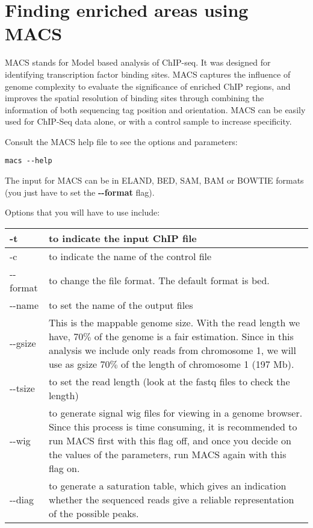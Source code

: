 \section{Finding enriched areas using MACS}

\begin{information}
MACS stands for Model based analysis of ChIP-seq. It was designed for identifying transcription factor binding sites. MACS captures the influence of genome complexity to evaluate the significance of enriched ChIP regions, and improves the spatial resolution of binding sites through combining the information of both sequencing tag position and orientation. MACS can be easily used for ChIP-Seq data alone, or with a control sample to increase specificity.
\end{information}

\begin{steps}
Consult the MACS help file to see the options and parameters:

\begin{lstlisting}
macs --help
\end{lstlisting}
\end{steps}

\begin{information}
The input for MACS can be in ELAND, BED, SAM, BAM or BOWTIE formats (you just have to set the \textbf{-{}-format} flag). 

Options that you will have to use include: 

\begin{tabular}{|p{2cm}|p{12.5cm}|}
\hline
-t & to indicate the input ChIP file \\
\hline
-c & to indicate the name of the control file \\
\hline
-{}-format & to change the file format. The default format is bed. \\
\hline
-{}-name & to set the name of the output files \\
\hline
-{}-gsize & This is the mappable genome size. With the read length we have, $70\%$ of the genome is a fair estimation. Since in this analysis we include only reads from chromosome 1, we will use as gsize $70\%$ of the length of chromosome 1 (197 Mb). \\ 
\hline
-{}-tsize & to set the read length (look at the fastq files to check the length) \\
\hline
-{}-wig & to generate signal wig files for viewing in a genome browser. Since this process is time consuming, it is recommended to run MACS first with this flag off, and once you decide on the values of the parameters, run MACS again with this flag on. \\
\hline
-{}-diag & to generate a saturation table, which gives an indication whether the sequenced reads give a reliable representation of the possible peaks. \\
\hline
\end{tabular}
\end{information}

